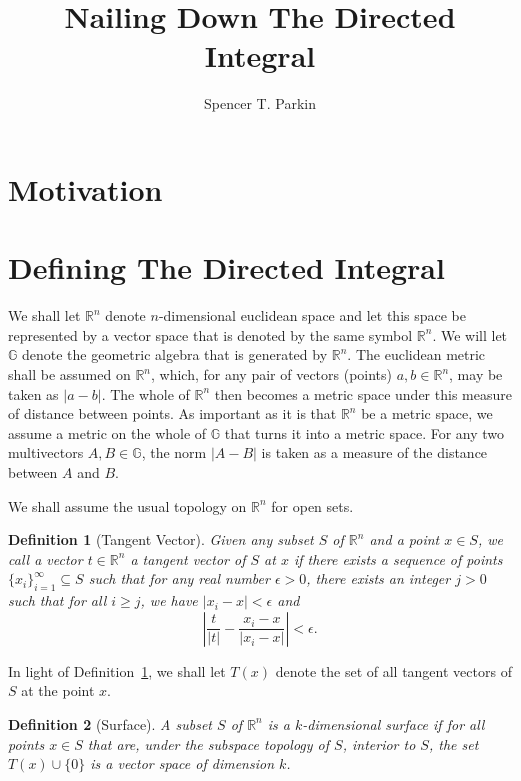 \documentclass[12pt]{article}
\title{Nailing Down The Directed Integral}
\author{Spencer T. Parkin}
\numberwithin{equation}{section}
\newcommand{\G}{\mathbb{G}}
\newcommand{\R}{\mathbb{R}}
\newtheorem{definition}{Definition}[section]
\begin{document}
\maketitle

\section{Motivation}


\section{Defining The Directed Integral}

We shall let $\R^n$ denote $n$-dimensional euclidean space and let this space be
represented by a vector space that is denoted by the same symbol $\R^n$.
We will let $\G$ denote the geometric algebra that is generated by $\R^n$.
The euclidean metric shall be assumed on $\R^n$,
which, for any pair of vectors (points) $a,b\in\R^n$, may be taken as $|a-b|$.
The whole of $\R^n$ then becomes a metric space under this measure of distance
between points.  As important as it is that $\R^n$ be a metric space, we assume
a metric on the whole of $\G$ that turns it into a metric space.  For any two
multivectors $A,B\in\G$, the norm $|A-B|$ is taken as a measure of the
distance between $A$ and $B$.

We shall assume the usual topology on $\R^n$ for open sets.

\begin{definition}[Tangent Vector]\label{def_tangent_vector}
Given any subset $S$ of $\R^n$ and a point $x\in S$, we call a vector $t\in\R^n$
a tangent vector of $S$ at $x$ if there exists a sequence of points $\{x_i\}_{i=1}^\infty\subseteq S$
such that for any real number $\epsilon>0$, there exists an integer $j>0$ such that
for all $i\geq j$, we have $|x_i-x|<\epsilon$ and
\begin{equation*}
\left|\frac{t}{|t|} - \frac{x_i-x}{|x_i-x|}\right|<\epsilon.
\end{equation*}
\end{definition}

In light of Definition~\ref{def_tangent_vector}, we shall let
$T(x)$ denote the set of all tangent vectors of $S$ at the point $x$.

\begin{definition}[Surface]\label{def_surface}
A subset $S$ of $\R^n$ is a $k$-dimensional surface if for all points $x\in S$ that
are, under the subspace topology of $S$, interior to $S$, the set
$T(x)\cup\{0\}$ is a vector space of dimension $k$.
\end{definition}
\end{document}
